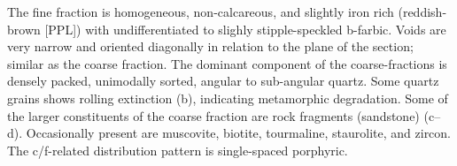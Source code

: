 \documentclass[a4paper]{article}
\begin{document}
\begin{multicols}{2}
\noindent The fine fraction is homogeneous, non-calcareous, and slightly iron rich (reddish-brown [PPL]) with undifferentiated to slighly stipple-speckled b-farbic. Voids are very narrow and oriented diagonally in relation to the plane of the section; similar as the coarse fraction. The dominant component of the coarse-fractions is densely packed, unimodally sorted, angular to sub-angular quartz. Some quartz grains shows rolling extinction (b), indicating metamorphic degradation. Some of the larger constituents of the coarse fraction are rock fragments (sandstone) (c--d). Occasionally present are muscovite,  biotite, tourmaline, staurolite, and zircon. The c/f-related distribution pattern is single-spaced porphyric.
\end{multicols}

\end{document}
